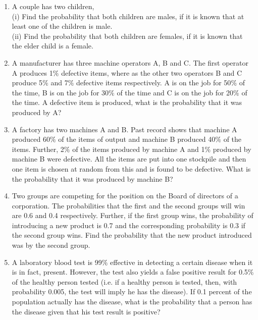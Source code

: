 \begin{enumerate}[label=\thesection.\arabic*.,ref=\thesection.\theenumi]
\item A couple has two children,\\
(i) Find the probability that both children are males, if it is known that at least one of the children is male.\\
(ii) Find the probability that both children are females, if it is known that the elder child is a female.\\
\item A manufacturer has three machine operators A, B and C. The first operator A
produces 1$\%$ defective items, where as the other two operators B and C produce 5$\%$ and 7$\%$ defective items respectively. A is on the job for 50$\%$ of the time, B is on the job for 30$\%$ of the time and C is on the job for 20$\%$ of the time. A defective item is produced, what is the probability that it was produced by A?\\
\solution


\item A factory has two machines A and B. Past record shows that machine A produced 60$\%$ of the items of output and machine B produced 40$\%$ of the items. Further, 2$\%$ of the items produced by machine A and 1$\%$ produced by machine B were defective. All the items are put into one stockpile and then one item is chosen at random from this and is found to be defective. What is the probability that it was produced by machine B?\\
%
\solution

\item Two groups are competing for the position on the Board of directors of a corporation. The probabilities that the first and the second groups will win are 0.6 and 0.4 respectively. Further, if the first group wins, the probability of introducing a new product is 0.7 and the corresponding probability is 0.3 if the second group wins. Find the probability that the new product introduced was by the second group.\\
%
\solution


\item A laboratory blood test is 99$\%$ effective in detecting a certain disease when it is in fact, present. However, the test also yields a false positive result for 0.5$\%$ of the healthy person tested (i.e. if a healthy person is tested, then, with probability 0.005, the test will imply he has the disease). If 0.1 percent of the population actually has the disease, what is the probability that a person has the disease given that his test result is positive?\\
%
\solution



\end{enumerate}
